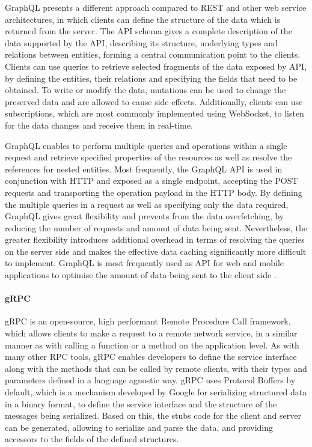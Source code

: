 GraphQL presents a different approach compared to REST and other web service architectures, in which clients can define the structure of the data which is returned from the server. The API schema gives a complete description of the data supported by the API, describing its structure, underlying types and relations between entities, forming a central communication point to the clients.
Clients can use queries to retrieve selected fragments of the data exposed by API, by defining the entities, their relations and specifying the fields that need to be obtained. To write or modify the data, mutations can be used to change the preserved data and are allowed to cause side effects.
Additionally, clients can use subscriptions, which are most commonly implemented using WebSocket, to listen for the data changes and receive them in real-time.

GraphQL enables to perform multiple queries and operations within a single request and retrieve specified properties of the resources as well as resolve the references for nested entities. Most frequently, the GraphQL API is used in conjunction with HTTP and exposed as a single endpoint, accepting the POST requests and transporting the operation payload in the HTTP body. By defining the multiple queries in a request as well as specifying only the data required, GraphQL gives great flexibility and prevents from the data overfetching, by reducing the number of requests and amount of data being sent. Nevertheless, the greater flexibility introduces additional overhead in terms of resolving the queries on the server side and makes the effective data caching significantly more difficult to implement. GraphQL is most frequently used as API for web and mobile applications to optimise the amount of data being sent to the client side \cite{APIDesignInDistributedSystems}.

\paragraph{gRPC}

gRPC \cite{gRPC} is an open-source, high performant Remote Procedure Call framework, which allows clients to make a request to a remote network service, in a similar manner as with calling a function or a method on the application level.
As with many other RPC tools, gRPC enables developers to define the service interface along with the methods that can be called by remote clients, with their types and parameters defined in a language agnostic way.
gRPC uses Protocol Buffers by default, which is a mechanism developed by Google for serializing structured data in a binary format, to define the service interface and the structure of the messages being serialized.
Based on this, the stubs code for the client and server can be generated, allowing to serialize and parse the data, and providing accessors to the fields of the defined structures.

